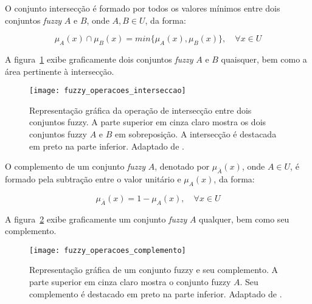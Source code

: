 \begin{defn}
\label{def:conjunto_fuzzy_interseccao}
O conjunto intersecção é formado por todos os valores mínimos entre dois conjuntos \emph{fuzzy} $A$ e $B$, onde $A, B \in U$, da forma:

\begin{equation}
  \mu_A(x) \cap \mu_B(x) = min\{\mu_A(x), \mu_B(x)\}, \quad \forall x \in U
\end{equation}
\end{defn}

A figura~\ref{fig:fuzzy_operacoes_interseccao} exibe graficamente dois conjuntos \emph{fuzzy} $A$ e $B$ quaisquer, bem como a área pertinente à intersecção.

\begin{figure}[!h]
  \centering
  \texttt{[image: fuzzy\_operacoes\_interseccao]}
  \caption[Operação de intersecção entre dois conjuntos fuzzy]{Representação gráfica da operação de intersecção entre dois conjuntos fuzzy. A parte superior em cinza claro mostra os dois conjuntos fuzzy $A$ e $B$ em sobreposição. A intersecção é destacada em preto na parte inferior. Adaptado de \citet{vrusias:06}.}
  \label{fig:fuzzy_operacoes_interseccao}
\end{figure}

\begin{defn}
\label{equ:conjunto_fuzzy_complemento}
O complemento de um conjunto \emph{fuzzy} $A$, denotado por $\mu_{\bar{A}}(x)$, onde $A \in U$, é formado pela subtração entre o valor unitário e $\mu_A(x)$, da forma:

\begin{equation}
  \mu_{\bar{A}}(x) = 1 - \mu_A(x), \quad \forall x \in U
\end{equation}
\end{defn}

A figura~\ref{fig:fuzzy_operacoes_complemento} exibe graficamente um conjunto \emph{fuzzy} $A$ qualquer, bem como seu complemento.

\begin{figure}[!h]
  \centering
  \texttt{[image: fuzzy\_operacoes\_complemento]}
  \caption[Conjunto fuzzy e seu complemento]{Representação gráfica de um conjunto fuzzy e seu complemento. A parte superior em cinza claro mostra o conjunto fuzzy $A$. Seu complemento é destacado em preto na parte inferior. Adaptado de \citet{vrusias:06}.}
  \label{fig:fuzzy_operacoes_complemento}
\end{figure}

